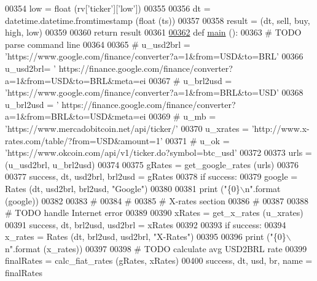 \begin{DoxyCode}
{{{00354     low  = float (rv[\textcolor{stringliteral}{'ticker'}][\textcolor{stringliteral}{'low'}])
00355     
00356     dt = datetime.datetime.fromtimestamp (float (ts))
00357     
00358     result = (dt, sell, buy, high, low)
00359     
00360     \textcolor{keywordflow}{return} result
00361 
\hyperlink{namespaceexch2exch_a4a7d6bc2c47add0970ca3e0c28a5cb63}{00362} \textcolor{keyword}{def }\hyperlink{namespaceexch2exch_a4a7d6bc2c47add0970ca3e0c28a5cb63}{main} ():
00363     \textcolor{comment}{# TODO parse command line }
00364 
00365     \textcolor{comment}{# u\_usd2brl = 'https://www.google.com/finance/converter?a=1&from=USD&to=BRL'}
00366     u\_usd2brl= \textcolor{stringliteral}{'
      https://finance.google.com/finance/converter?a=1&from=USD&to=BRL&meta=ei%
00367 \textcolor{comment}{#    u\_brl2usd = 'https://www.google.com/finance/converter?a=1&from=BRL&to=USD'}
00368     u\_brl2usd = \textcolor{stringliteral}{'
      https://finance.google.com/finance/converter?a=1&from=BRL&to=USD&meta=ei%
00369 \textcolor{comment}{#    u\_mb      = 'https://www.mercadobitcoin.net/api/ticker/'}
00370     u\_xrates  = \textcolor{stringliteral}{'http://www.x-rates.com/table/?from=USD&amount=1'}
00371 \textcolor{comment}{#    u\_ok      = 'https://www.okcoin.com/api/v1/ticker.do?symbol=btc\_usd'}
00372     
00373     urls = (u\_usd2brl, u\_brl2usd)
00374     
00375     gRates = get\_google\_rates (urls)
00376     
00377     success, dt, usd2brl, brl2usd = gRates
00378     \textcolor{keywordflow}{if} success:   
00379         google = Rates (dt, usd2brl, brl2usd, \textcolor{stringliteral}{"Google"})
00380     
00381         \textcolor{keywordflow}{print} (\textcolor{stringliteral}{"\{0\}\(\backslash\)n"}.format (google))
00382     
00383     \textcolor{comment}{#}
00384     \textcolor{comment}{#}
00385     \textcolor{comment}{# X-rates section }
00386     \textcolor{comment}{# }
00387     
00388     \textcolor{comment}{# TODO handle Internet error }
00389 
00390     xRates = get\_x\_rates (u\_xrates)
00391     success, dt, brl2usd, usd2brl = xRates
00392     
00393     \textcolor{keywordflow}{if} success:
00394         x\_rates = Rates (dt, brl2usd, usd2brl, \textcolor{stringliteral}{"X-Rates"})
00395     
00396         \textcolor{keywordflow}{print} (\textcolor{stringliteral}{"\{0\}\(\backslash\)n"}.format (x\_rates))
00397     
00398     \textcolor{comment}{# TODO calculate avg USD2BRL rate}
00399     finalRates = calc\_fiat\_rates (gRates, xRates)
00400     success, dt, usd, br, name = finalRates
}}}}}
\end{DoxyCode}
